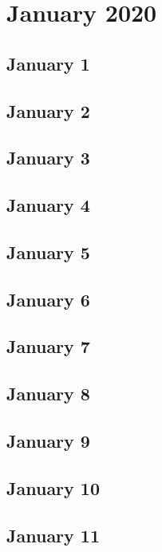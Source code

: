 \chapter{January 2020}

\section{January 1}

\section{January 2}

\section{January 3}

\section{January 4}

\section{January 5}

\section{January 6}

\section{January 7}

\section{January 8}

\section{January 9}

\section{January 10}

\section{January 11}

